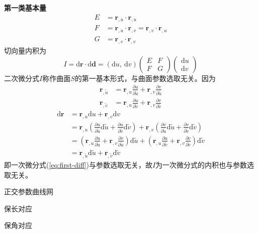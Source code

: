 \textbf{第一类基本量}
\begin{equation}
    \begin{aligned}
        E &= \mathbf{r}_{,u}\cdot\mathbf{r}_{,u} \\
        F &= \mathbf{r}_{,u}\cdot\mathbf{r}_{,v} = \mathbf{r}_{,v}\cdot\mathbf{r}_{,u} \\
        G &= \mathbf{r}_{,v}\cdot\mathbf{r}_{,v}
    \end{aligned}
\end{equation}
切向量内积为
\begin{equation}
    I = \mathrm{d}\mathbf{r} \cdot \mathrm{d}\mathbf{d} = 
    \left(\mathrm{d}u,\ \mathrm{d}v\right)\left(\begin{array}{cc}
        E & F \\ F & G
    \end{array}\right)\left(\begin{array}{c}
        \mathrm{d}u \\ \mathrm{d}v
    \end{array}\right)
\end{equation}
二次微分式$I$称作曲面$S$的第一基本形式，与曲面参数选取无关。因为
\begin{equation}
    \begin{aligned}
        \mathbf{r}_{,\tilde{u}} &= \mathbf{r}_{,u}\frac{\partial u}{\partial \tilde{u}} + \mathbf{r}_{,v}\frac{\partial v}{\partial \tilde{u}} \\
        \mathbf{r}_{,\tilde{v}} &= \mathbf{r}_{,u}\frac{\partial u}{\partial \tilde{v}} + \mathbf{r}_{,v}\frac{\partial v}{\partial \tilde{v}}
    \end{aligned}
\end{equation}
\begin{equation}
    \begin{aligned}
    \mathrm{d}\mathbf{r} &= \mathbf{r}_{,u}\mathrm{d}u + \mathbf{r}_{,v}\mathrm{d}v  \\
    &= \mathbf{r}_{,u}\left(\frac{\partial u}{\partial \tilde{u}}\mathrm{d}\tilde{u} + \frac{\partial u}{\partial \tilde{v}}\mathrm{d}\tilde{v}\right) + 
       \mathbf{r}_{,v}\left(\frac{\partial v}{\partial \tilde{u}}\mathrm{d}\tilde{u} + \frac{\partial v}{\partial \tilde{v}}\mathrm{d}\tilde{v}\right)  \\
    &= \left(\mathbf{r}_{,u}\frac{\partial u}{\partial \tilde{u}} + \mathbf{r}_{,v}\frac{\partial v}{\partial \tilde{u}}\right)\mathrm{d}\tilde{u} + 
       \left(\mathbf{r}_{,u}\frac{\partial u}{\partial \tilde{v}} + \mathbf{r}_{,v}\frac{\partial v}{\partial \tilde{v}}\right)\mathrm{d}\tilde{v} \\
    &= \mathbf{r}_{,\tilde{u}}\mathrm{d}\tilde{u} + \mathbf{r}_{,\tilde{v}}\mathrm{d}\tilde{v}
    \end{aligned}
\end{equation}
即一次微分式(\ref{eq:first-diff})与参数选取无关，故$I$为一次微分式的内积也与参数选取无关。

正交参数曲线网

保长对应

保角对应
